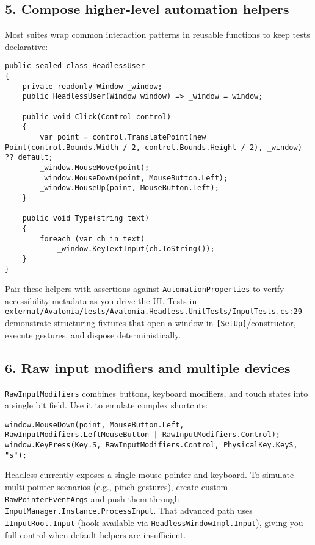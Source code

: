 \subsection{5. Compose higher-level automation
helpers}\label{compose-higher-level-automation-helpers}

Most suites wrap common interaction patterns in reusable functions to
keep tests declarative:

\begin{lstlisting}
public sealed class HeadlessUser
{
    private readonly Window _window;
    public HeadlessUser(Window window) => _window = window;

    public void Click(Control control)
    {
        var point = control.TranslatePoint(new Point(control.Bounds.Width / 2, control.Bounds.Height / 2), _window) ?? default;
        _window.MouseMove(point);
        _window.MouseDown(point, MouseButton.Left);
        _window.MouseUp(point, MouseButton.Left);
    }

    public void Type(string text)
    {
        foreach (var ch in text)
            _window.KeyTextInput(ch.ToString());
    }
}
\end{lstlisting}

Pair these helpers with assertions against
\passthrough{\lstinline!AutomationProperties!} to verify accessibility
metadata as you drive the UI. Tests in
\passthrough{\lstinline!external/Avalonia/tests/Avalonia.Headless.UnitTests/InputTests.cs:29!}
demonstrate structuring fixtures that open a window in
\passthrough{\lstinline![SetUp]!}/constructor, execute gestures, and
dispose deterministically.

\subsection{6. Raw input modifiers and multiple
devices}\label{raw-input-modifiers-and-multiple-devices}

\passthrough{\lstinline!RawInputModifiers!} combines buttons, keyboard
modifiers, and touch states into a single bit field. Use it to emulate
complex shortcuts:

\begin{lstlisting}
window.MouseDown(point, MouseButton.Left, RawInputModifiers.LeftMouseButton | RawInputModifiers.Control);
window.KeyPress(Key.S, RawInputModifiers.Control, PhysicalKey.KeyS, "s");
\end{lstlisting}

Headless currently exposes a single mouse pointer and keyboard. To
simulate multi-pointer scenarios (e.g., pinch gestures), create custom
\passthrough{\lstinline!RawPointerEventArgs!} and push them through
\passthrough{\lstinline!InputManager.Instance.ProcessInput!}. That
advanced path uses \passthrough{\lstinline!IInputRoot.Input!} (hook
available via \passthrough{\lstinline!HeadlessWindowImpl.Input!}),
giving you full control when default helpers are insufficient.

